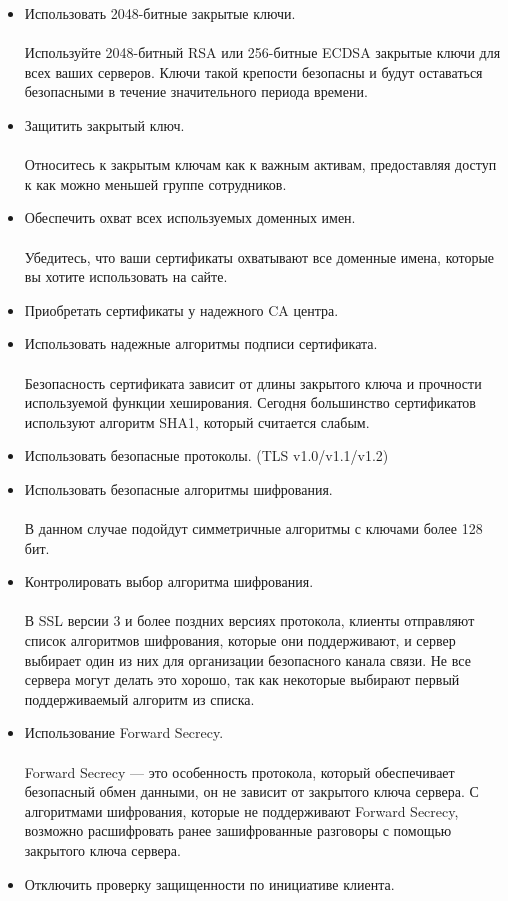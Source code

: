 \documentclass{article}
\begin{document}
\begin{itemize}
\item Использовать 2048-битные закрытые ключи.\\\\
Используйте 2048-битный RSA или 256-битные ECDSA закрытые ключи для всех ваших серверов. Ключи такой крепости безопасны и будут оставаться безопасными в течение значительного периода времени.

\item Защитить закрытый ключ.\\\\
Относитесь к закрытым ключам как к важным активам, предоставляя доступ к как можно меньшей группе сотрудников.

\item Обеспечить охват всех используемых доменных имен.\\\\
Убедитесь, что ваши сертификаты охватывают все доменные имена, которые вы хотите использовать на сайте.

\item Приобретать сертификаты у надежного CA центра.

\item Использовать надежные алгоритмы подписи сертификата.\\\\
Безопасность сертификата зависит от длины закрытого ключа и прочности используемой функции хеширования. Сегодня большинство сертификатов используют алгоритм SHA1, который считается слабым. 

\item Использовать безопасные протоколы. (TLS v1.0/v1.1/v1.2)

\item Использовать безопасные алгоритмы шифрования.\\\\
В данном случае подойдут симметричные алгоритмы с ключами более 128 бит.

\item Контролировать выбор алгоритма шифрования.\\\\
В SSL версии 3 и более поздних версиях протокола, клиенты отправляют список алгоритмов шифрования, которые они поддерживают, и сервер выбирает один из них для организации безопасного канала связи. Не все сервера могут делать это хорошо, так как некоторые выбирают первый поддерживаемый алгоритм из списка.

\item Использование Forward Secrecy.\\\\
Forward Secrecy — это особенность протокола, который обеспечивает безопасный обмен данными, он не зависит от закрытого ключа сервера. С алгоритмами шифрования, которые не поддерживают Forward Secrecy, возможно расшифровать ранее зашифрованные разговоры с помощью закрытого ключа сервера.

\item Отключить проверку защищенности по инициативе клиента.
\end{itemize}
\end{document}
